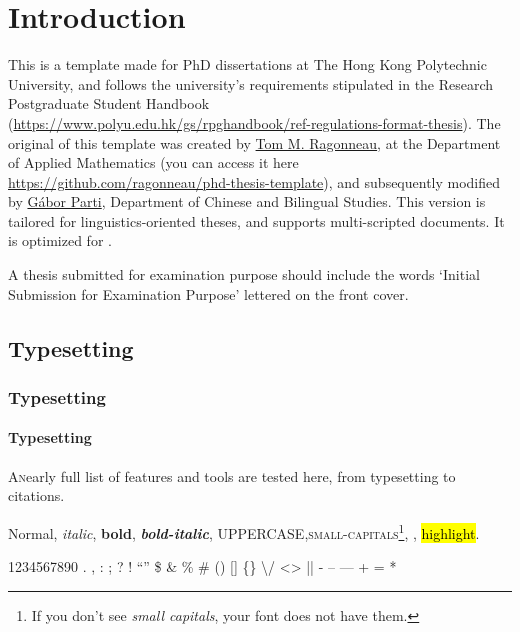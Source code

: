 \chapter{Introduction}
\label{sec:test}

This is a template made for PhD dissertations at The Hong Kong Polytechnic University, and follows the university's requirements stipulated in the Research Postgraduate Student Handbook (\url{https://www.polyu.edu.hk/gs/rpghandbook/ref-regulations-format-thesis}). The original of this  template was created by \href{https://github.com/ragonneau}{Tom M. Ragonneau}, at the Department of Applied Mathematics (you can access it here \url{https://github.com/ragonneau/phd-thesis-template}), and subsequently modified by \href{https://github.com/partigabor}{Gábor Parti}, Department of Chinese and Bilingual Studies. This version is tailored for linguistics-oriented theses, and supports multi-scripted documents. It is optimized for .

A thesis submitted for examination purpose should include the words ‘Initial Submission for Examination Purpose’ lettered on the front cover.

\section{Typesetting}
\subsection{Typesetting}
\subsubsection{Typesetting}

\lettrine[lines=5, slope=0.5em, lraise=0, nindent=1em, findent=-1em]{\textcolor{\accentcolor}{A}} nearly full list of features and tools are tested here, from typesetting to citations. \blindtext

\medskip 

Normal, \textit{italic}, \textbf{bold}, \textbf{\textit{bold-italic}}, UPPERCASE,\textsc{small-capitals}\footnote{If you don't see \emph{small capitals}, your font does not have them.}, , \hl{highlight}.

\medskip

1234567890      \BC{} \AD{} . , : ; ? ! ``'' \$ \& \% \# () [] \{\} \textbackslash / <> || - -- --- + = *

